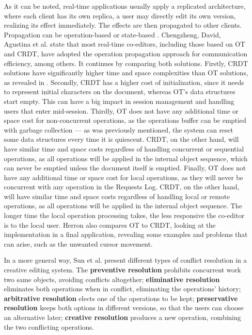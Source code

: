 As it can be noted, real-time applications usually apply a replicated architecture, where each client has its own replica, a user may directly edit its own version, realizing its effect immediately. The effects are then propagated to other clients.
Propagation can be operation-based \cite{Oster2006} \cite{Sun1998-ot} \cite{Sun1998} \cite{Weiss2009} or state-based \cite{Fraser2009}. Chengzheng, David, Agustina et al. \cite{Chengzheng2020} state that most real-time co-editors, including those based on OT and CRDT, have adopted the operation propagation approach for communication efficiency, among others. It continues by comparing both solutions. Firstly, CRDT solutions have significantly higher time and space complexities than OT solutions, as revealed in \cite{Sun2020}. Secondly, CRDT has a higher cost of initialization, since it needs to represent initial characters on the document, whereas OT's data structures start empty. This can have a big impact in session management and handling users that enter mid-session. Thirdly, OT does not have any additional time or space cost for non-concurrent operations, as the operations buffer can be emptied with garbage collection --- as was previously mentioned, the system can reset some data structures every time it is quiescent. CRDT, on the other hand, will have similar time and space costs regardless of handling concurrent or sequential operations, as all operations will be applied in the internal object sequence, which can never be emptied unless the document itself is emptied. Finally, OT does not have any additional time or space cost for local operations, as they will never be concurrent with any operation in the Requests Log. CRDT, on the other hand, will have similar time and space costs regardless of handling local or remote operations, as all operations will be applied in the internal object sequence. The longer time the local operation processing takes, the less responsive the co-editor is to the local user. Herron \cite{Herron-ot-crdt} also compares OT to CRDT, looking at the implementation in a final application, revealing some examples and problems that can arise, such as the unwanted cursor movement.

In a more general way, Sun et al. \cite{Sun2012} present different types of conflict resolution in a creative editing system. The \textbf{preventive resolution} prohibits concurrent work two same objects, avoiding conflicts altogether; \textbf{eliminative resolution} eliminates both operations when in conflict, eliminating the operations' history; \textbf{arbitrative resolution} elects one of the operations to be kept; \textbf{preservative resolution} keeps both options in different versions, so that the users can choose an alternative later; \textbf{creative resolution} produces a new operation, combining the two conflicting operations.

